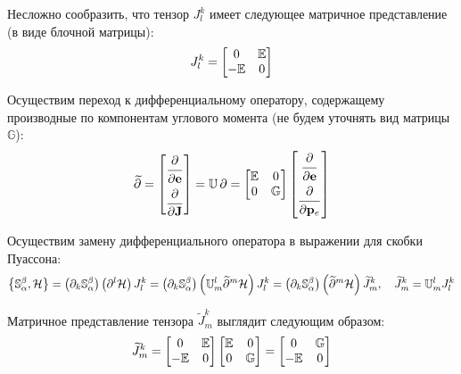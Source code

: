 \documentclass[12pt]{article}
\newcommand{\bbU}{\mathbb{U}}
\newcommand{\bbG}{\mathbb{G}}
\newcommand{\bbE}{\mathbb{E}}
\newcommand{\bbS}{\mathbb{S}}
\newcommand{\mH}{\mathcal{H}}
\newcommand{\lb}{\left(}
\newcommand{\rb}{\right)}
\newcommand{\lcb}{\left\{}
\newcommand{\rcb}{\right\}}
\begin{document}
Несложно сообразить, что тензор $J^{k}_{l}$ имеет следующее матричное представление (в виде блочной матрицы):
\begin{gather}
	J^{k}_{l} =
	\begin{bmatrix}
		0 & \bbE \\
		-\bbE & 0
	\end{bmatrix} \notag
\end{gather}

Осуществим переход к дифференциальному оператору, содержащему производные по компонентам углового момента (не будем уточнять вид матрицы $\bbG$):
\begin{gather}
	\widetilde{\partial} = 
	\begin{bmatrix}
		\dfrac{\strut\partial}{\strut\partial \mathbf{e}} \\
		\dfrac{\strut\partial}{\partial \mathbf{J}} \\
	\end{bmatrix} = \bbU \, \partial =  
	\begin{bmatrix}
		\bbE & 0 \\
		0 & \bbG
	\end{bmatrix}
	\begin{bmatrix}
		\dfrac{\strut\partial}{\strut\partial \mathbf{e}} \\
		\dfrac{\strut\partial}{\strut\partial \mathbf{p}_e} \\
	\end{bmatrix} \notag
\end{gather}

Осуществим замену дифференциального оператора в выражении для скобки Пуассона:
\begin{gather}
	\lcb \bbS^\beta_\alpha , \mH \rcb = \lb \partial_k \bbS^\beta_\alpha \rb \lb \partial^l \mH \rb J^k_l = \lb \partial_k \bbS^\beta_\alpha \rb \lb \bbU^l_m \widetilde{\partial}^m \mH \rb J^k_l = \lb \partial_k \bbS^\beta_\alpha \rb \lb \widetilde{\partial}^m \mH \rb \widetilde{J}^k_m, \quad \widetilde{J}^k_m = \bbU^l_m J^k_l \notag 
\end{gather}

Матричное представление тензора $\widetilde{J}_m^k$ выглядит следующим образом:
\begin{gather}
	\widetilde{J}_m^k = 
	\begin{bmatrix}
		0 & \bbE \\
		-\bbE & 0
	\end{bmatrix} 
	\begin{bmatrix}
		\bbE & 0 \\
		0 & \bbG
	\end{bmatrix} = 
	\begin{bmatrix}
		0 & \bbG \\
		-\bbE & 0
	\end{bmatrix} \notag
\end{gather}
\end{document}
